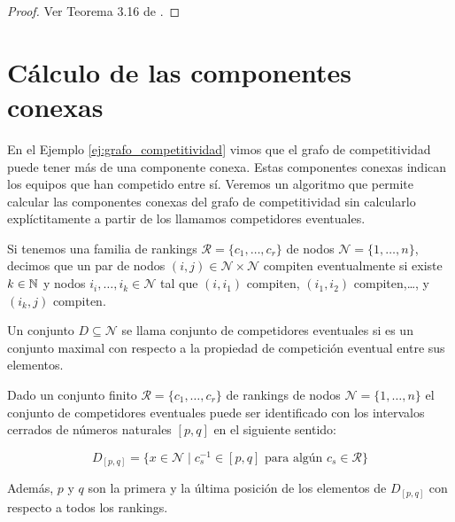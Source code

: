 \begin{proof}
Ver Teorema 3.16 de \cite{journals/corr/CriadoGPR13a}.
\end{proof}


\section{Cálculo de las componentes conexas}

En el Ejemplo \ref{ej:grafo_competitividad} vimos que el grafo de competitividad puede tener más de una componente conexa. Estas componentes conexas indican los equipos que han competido entre sí. Veremos un algoritmo que permite calcular las componentes conexas del grafo de competitividad sin calcularlo explíctitamente a partir de los llamamos competidores eventuales.

\begin{defi}
Si tenemos una familia de rankings $\mathcal{R} = \{c_1,\dots,c_r\}$ de nodos $\mathcal{N} = \{1,\dots,n\}$, decimos que un par de nodos $(i,j) \in \mathcal{N} \times \mathcal{N}$ compiten eventualmente si existe $k \in \mathbb{N}$ y nodos $i_i,\dots,i_k \in \mathcal{N}$ tal que $(i,i_1)$ compiten, $(i_1,i_2)$ compiten,\dots, y $(i_k,j)$ compiten. 
\end{defi}

\begin{defi}
Un conjunto $D \subseteq \mathcal{N}$ se llama conjunto de competidores eventuales si es un conjunto maximal con respecto a la propiedad de competición eventual entre sus elementos.
\end{defi}

\begin{teo}
Dado un conjunto finito $\mathcal{R} = \{ c_1, \dots, c_r \}$ de rankings de nodos $\mathcal{N} = \{1,\dots, n\}$ el conjunto de competidores eventuales puede ser identificado con los intervalos cerrados de números naturales $[p,q]$ en el siguiente sentido:

\begin{equation*}
D_{[p,q]} = \{ x \in \mathcal{N} \mid c_s^{-1} \in [p,q] \text{ para algún } c_s \in \mathcal{R} \}
\end{equation*}

Además, $p$ y $q$ son la primera y la última posición de los elementos de $D_{[p,q]}$ con respecto a todos los rankings.
\end{teo} 

